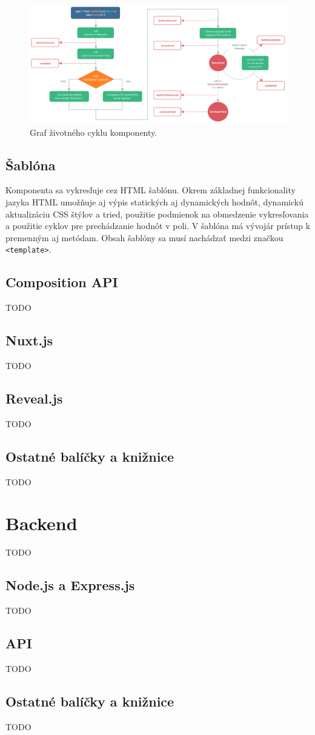     \begin{figure}[!hbt]
        \centering
        \includegraphics[scale=0.3]{obrazky/lifecycle.png}
        \caption{Graf životného cyklu komponenty\cite{vue-guide}.}
        \label{pic:components}
    \end{figure}

\subsection*{Šablóna}
Komponenta sa vykresľuje cez HTML šablónu. Okrem základnej funkcionality jazyka HTML umožňuje aj výpis statických aj dynamických hodnôt, dynamickú aktualizáciu CSS štýlov a tried, použitie podmienok na obmedzenie vykresľovania a použitie cyklov pre prechádzanie hodnôt v poli. V šablóna má vývojár prístup k premenným aj metódam. Obsah šablóny sa musí nachádzať medzi značkou \texttt{<template>}.

\subsection{Composition API}
\label{compositionapi}
TODO

\subsection{Nuxt.js}
TODO

\subsection{Reveal.js}
TODO

\subsection{Ostatné balíčky a knižnice}
TODO

\section{Backend}
TODO

\subsection{Node.js a Express.js}
\label{node}
TODO

\subsection{API}
TODO

\subsection{Ostatné balíčky a knižnice}
TODO